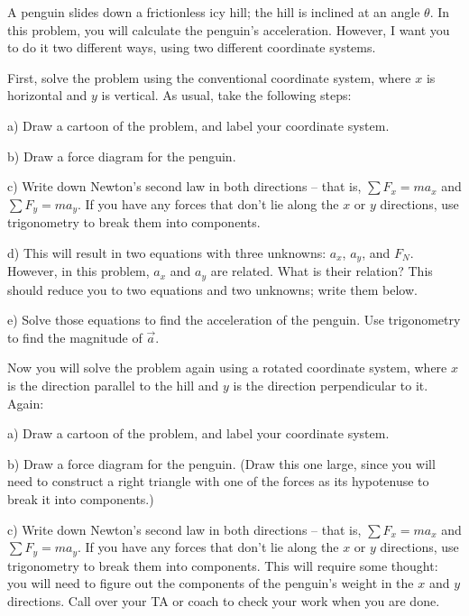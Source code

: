 \documentclass[12pt]{article}
\begin{document}
\Large
\centerline{}
\normalsize
\centerline{}

A penguin slides down a frictionless icy hill; the hill is inclined at an angle $\theta$. In this problem, you will 
calculate the penguin's acceleration. However, I want you to do it two different ways, using two different coordinate systems.

First, solve the problem using the conventional coordinate system, where $x$ is horizontal and $y$ is vertical. As usual, take the following steps:

a) Draw a cartoon of the problem, and label your coordinate system.

\vspace{2in}


b) Draw a force diagram for the penguin. 

\vspace{2in}

c) Write down Newton's second law in both directions -- that is, $\sum F_x = ma_x$ and $\sum F_y = ma_y$. If you have any forces that don't lie along the $x$ or $y$ directions, use trigonometry to break them into components.

\vspace{2in}
\newpage
d) This will result in two equations with three unknowns: $a_x$, $a_y$, and $F_N$. However, in this problem, $a_x$ and $a_y$ are related. What is their relation? This should reduce you to two equations and two unknowns; write them below.
\vspace{3in}

e) Solve those equations to find the acceleration of the penguin. Use trigonometry to find the magnitude of $\vec a$.

\newpage
Now you will solve the problem again using a rotated coordinate system, where $x$ is the direction parallel to the hill and $y$ is the direction perpendicular to it. Again:

a) Draw a cartoon of the problem, and label your coordinate system. 

\vspace{2in}

b) Draw a force diagram for the penguin. (Draw this one large, since you will need to construct a right triangle 
with one of the forces as its hypotenuse to break it into components.) 

\vspace{3in}

c) Write down Newton's second law in both directions -- that is, $\sum F_x = ma_x$ and $\sum F_y = ma_y$. 
If you have any forces that don't lie along the $x$ or $y$ directions, use trigonometry to break them into components.
This will require some thought: you will need to figure out the components of the 
penguin's weight in the $x$ and $y$ directions. Call over your TA or coach to check your work when you are done.
\end{document}
